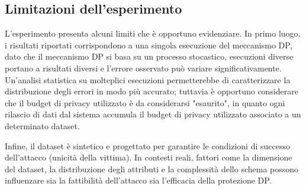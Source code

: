 \subsection{Limitazioni dell'esperimento}

L'esperimento presenta alcuni limiti che è opportuno evidenziare. In primo luogo, i risultati riportati corrispondono a una singola esecuzione del meccanismo DP, dato che il meccanismo DP si basa su un processo stocastico, esecuzioni diverse portano a risultati diversi e l'errore osservato può variare significativamente. Un'analisi statistica su molteplici esecuzioni permetterebbe di caratterizzare la distribuzione degli errori in modo più accurato; tuttavia è opportuno considerare che il budget di privacy utilizzato è da considerarsi "esaurito", in quanto ogni rilascio di dati dal sistema accumula il budget di privacy utilizzato associato a un determinato dataset.

Infine, il dataset è sintetico e progettato per garantire le condizioni di successo dell'attacco (unicità della vittima). In contesti reali, fattori come la dimensione del dataset, la distribuzione degli attributi e la complessità dello schema possono influenzare sia la fattibilità dell'attacco sia l'efficacia della protezione DP.
